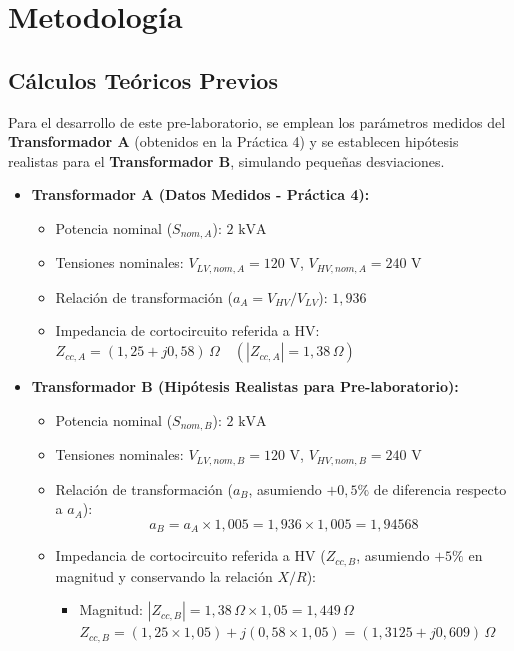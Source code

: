 \section{Metodología}

\subsection{Cálculos Teóricos Previos}

Para el desarrollo de este pre-laboratorio, se emplean los parámetros medidos del \textbf{Transformador A} (obtenidos en la Práctica 4) y se establecen hipótesis realistas para el \textbf{Transformador B}, simulando pequeñas desviaciones.


\begin{itemize}
    \item \textbf{Transformador A (Datos Medidos - Práctica 4):}
        \begin{itemize}
            \item Potencia nominal ($S_{nom,A}$): $2\text{ kVA}$
            \item Tensiones nominales: $V_{LV,nom,A} = 120\text{ V}$, $V_{HV,nom,A} = 240\text{ V}$
            \item Relación de transformación ($a_A = V_{HV} / V_{LV}$): $1,936$
            \item Impedancia de cortocircuito referida a HV: $Z_{cc,A} = (1,25 + j0,58)\,\Omega \quad (|Z_{cc,A}| = 1,38\,\Omega)$
        \end{itemize}
    \item \textbf{Transformador B (Hipótesis Realistas para Pre-laboratorio):}
        \begin{itemize}
            \item Potencia nominal ($S_{nom,B}$): $2\text{ kVA}$
            \item Tensiones nominales: $V_{LV,nom,B} = 120\text{ V}$, $V_{HV,nom,B} = 240\text{ V}$
            \item Relación de transformación ($a_B$, asumiendo $+0,5\%$ de diferencia respecto a $a_A$):
                $$a_B = a_A \times 1,005 = 1,936 \times 1,005 = 1,94568$$
            \item Impedancia de cortocircuito referida a HV ($Z_{cc,B}$, asumiendo $+5\%$ en magnitud y conservando la relación $X/R$):
                \begin{itemize}
                    \item Magnitud: $|Z_{cc,B}| = 1,38\,\Omega \times 1,05 = 1,449\,\Omega$  $Z_{cc,B} = (1,25 \times 1,05) + j(0,58 \times 1,05) = (1,3125 + j0,609)\,\Omega$
                \end{itemize}
        \end{itemize}
\end{itemize}

